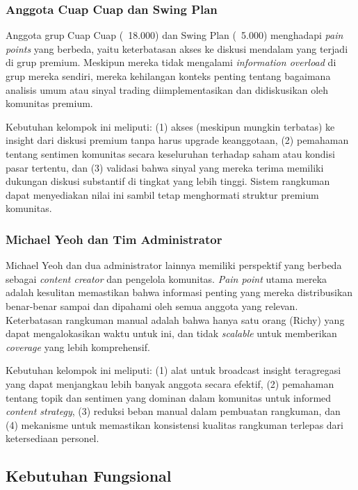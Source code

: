 \subsubsection{Anggota Cuap Cuap dan Swing Plan}

Anggota grup Cuap Cuap (~18.000) dan Swing Plan (~5.000) menghadapi \textit{pain points} yang berbeda, yaitu keterbatasan akses ke diskusi mendalam yang terjadi di grup premium. Meskipun mereka tidak mengalami \textit{information overload} di grup mereka sendiri, mereka kehilangan konteks penting tentang bagaimana analisis umum atau sinyal trading diimplementasikan dan didiskusikan oleh komunitas premium.

Kebutuhan kelompok ini meliputi: (1) akses (meskipun mungkin terbatas) ke insight dari diskusi premium tanpa harus upgrade keanggotaan, (2) pemahaman tentang sentimen komunitas secara keseluruhan terhadap saham atau kondisi pasar tertentu, dan (3) validasi bahwa sinyal yang mereka terima memiliki dukungan diskusi substantif di tingkat yang lebih tinggi. Sistem rangkuman dapat menyediakan nilai ini sambil tetap menghormati struktur premium komunitas.

\subsubsection{Michael Yeoh dan Tim Administrator}

Michael Yeoh dan dua administrator lainnya memiliki perspektif yang berbeda sebagai \textit{content creator} dan pengelola komunitas. \textit{Pain point} utama mereka adalah kesulitan memastikan bahwa informasi penting yang mereka distribusikan benar-benar sampai dan dipahami oleh semua anggota yang relevan. Keterbatasan rangkuman manual adalah bahwa hanya satu orang (Richy) yang dapat mengalokasikan waktu untuk ini, dan tidak \textit{scalable} untuk memberikan \textit{coverage} yang lebih komprehensif.

Kebutuhan kelompok ini meliputi: (1) alat untuk broadcast insight teragregasi yang dapat menjangkau lebih banyak anggota secara efektif, (2) pemahaman tentang topik dan sentimen yang dominan dalam komunitas untuk informed \textit{content strategy}, (3) reduksi beban manual dalam pembuatan rangkuman, dan (4) mekanisme untuk memastikan konsistensi kualitas rangkuman terlepas dari ketersediaan personel.

\subsection{Kebutuhan Fungsional}


